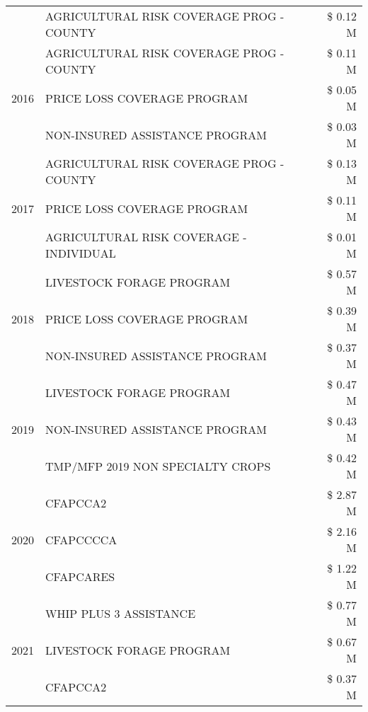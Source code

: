 \begin{tabular}{llr}
 & AGRICULTURAL RISK COVERAGE PROG - COUNTY & \$ 0.12 M \\
\cline{1-3}
\multirow[t]{3}{*}{2016} & AGRICULTURAL RISK COVERAGE PROG - COUNTY      & \$ 0.11 M \\
 & PRICE LOSS COVERAGE PROGRAM                   & \$ 0.05 M \\
 & NON-INSURED ASSISTANCE PROGRAM                & \$ 0.03 M \\
\cline{1-3}
\multirow[t]{3}{*}{2017} & AGRICULTURAL RISK COVERAGE PROG - COUNTY & \$ 0.13 M \\
 & PRICE LOSS COVERAGE PROGRAM & \$ 0.11 M \\
 & AGRICULTURAL RISK COVERAGE - INDIVIDUAL & \$ 0.01 M \\
\cline{1-3}
\multirow[t]{3}{*}{2018} & LIVESTOCK FORAGE PROGRAM & \$ 0.57 M \\
 & PRICE LOSS COVERAGE PROGRAM & \$ 0.39 M \\
 & NON-INSURED ASSISTANCE PROGRAM & \$ 0.37 M \\
\cline{1-3}
\multirow[t]{3}{*}{2019} & LIVESTOCK FORAGE PROGRAM & \$ 0.47 M \\
 & NON-INSURED ASSISTANCE PROGRAM & \$ 0.43 M \\
 & TMP/MFP 2019 NON SPECIALTY CROPS & \$ 0.42 M \\
\cline{1-3}
\multirow[t]{3}{*}{2020} & CFAPCCA2 & \$ 2.87 M \\
 & CFAPCCCCA & \$ 2.16 M \\
 & CFAPCARES & \$ 1.22 M \\
\cline{1-3}
\multirow[t]{3}{*}{2021} & WHIP PLUS 3 ASSISTANCE & \$ 0.77 M \\
 & LIVESTOCK FORAGE PROGRAM & \$ 0.67 M \\
 & CFAPCCA2 & \$ 0.37 M \\
\cline{1-3}
\bottomrule
\end{tabular}
